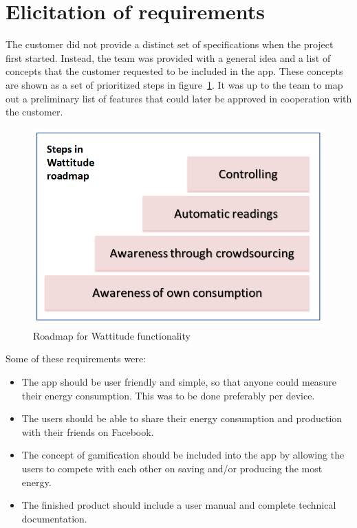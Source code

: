 \section{Elicitation of requirements}
\label{sec:obtainingreq}

The customer did not provide a distinct set of specifications when the project first started. Instead, the team was provided with a general idea and a list of concepts that the customer requested to be included in the app. These concepts are shown as a set of prioritized steps in figure~\ref{fig:roadmap}. It was up to the team to map out a preliminary list of features that could later be approved in cooperation with the customer.

\begin{figure}[H]
\centering
\includegraphics[height=0.4\textheight]{ch/specification/fig/roadmap.png}
\caption{Roadmap for Wattitude functionality}
\label{fig:roadmap}
\end{figure}

Some of these requirements were:
\begin{itemize}
\item The app should be user friendly and simple, so that anyone could measure their energy consumption. This was to be done preferably per device. 
\item The users should be able to share their energy consumption and production with their friends on Facebook. 
\item The concept of \gls{gamification} should be included into the app by allowing the users to compete with each other on saving and/or producing the most energy. 
\item The finished product should include a user manual and complete technical documentation.
\end{itemize}

